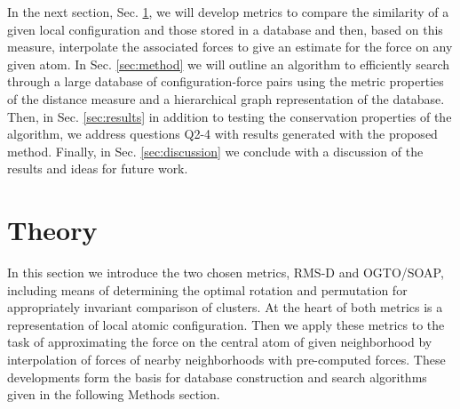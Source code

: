 \documentclass[journal=jctcce,manuscript=article]{achemso}
\newcommand{\sref}[1]{{Sec. \ref{#1}}}
\begin{document}
In the next section, \sref{sec:theory}, we will develop metrics to compare the similarity of a given local configuration and those stored in a database and then, based on this measure, interpolate the associated forces to give an estimate for the force on any given atom.
In \sref{sec:method} we will outline an algorithm to efficiently search through a large database of configuration-force pairs using the metric properties of the distance measure and a hierarchical graph representation of the database.
Then, in \sref{sec:results} in addition to testing the conservation properties of the algorithm, we address questions Q2-4 with results generated with the proposed method.
Finally, in \sref{sec:discussion} we conclude with a discussion of the results and ideas for future work.

\section{Theory} \label{sec:theory}
In this section we introduce the two chosen metrics, RMS-D and OGTO/SOAP, including means of determining the optimal rotation and permutation for appropriately invariant comparison of clusters. 
At the heart of both metrics is a representation of local atomic configuration.
Then we apply these metrics to the task of approximating the force on the central atom of given neighborhood by interpolation of forces of nearby neighborhoods with pre-computed forces.
These developments form the basis for database construction and search algorithms given in the following Methods section.

\end{document}
